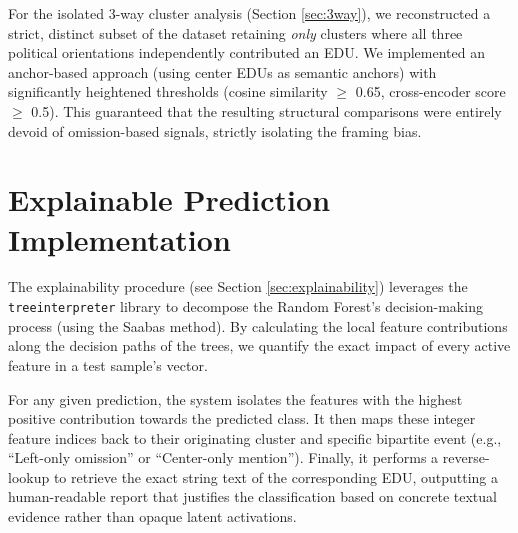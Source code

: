 \documentclass[11pt]{article}
\begin{document}
For the isolated 3-way cluster analysis (Section \ref{sec:3way}), we reconstructed a strict, distinct subset of the dataset retaining \textit{only} clusters where all three political orientations independently contributed an EDU. We implemented an anchor-based approach (using center EDUs as semantic anchors) with significantly heightened thresholds (cosine similarity $\geq$ 0.65, cross-encoder score $\geq$ 0.5). This guaranteed that the resulting structural comparisons were entirely devoid of omission-based signals, strictly isolating the framing bias.

\section{Explainable Prediction Implementation}
\label{app:explainability}
The explainability procedure (see Section \ref{sec:explainability}) leverages the \texttt{treeinterpreter} library to decompose the Random Forest's decision-making process (using the Saabas method). By calculating the local feature contributions along the decision paths of the trees, we quantify the exact impact of every active feature in a test sample's vector.

For any given prediction, the system isolates the features with the highest positive contribution towards the predicted class. It then maps these integer feature indices back to their originating cluster and specific bipartite event (e.g., ``Left-only omission'' or ``Center-only mention''). Finally, it performs a reverse-lookup to retrieve the exact string text of the corresponding EDU, outputting a human-readable report that justifies the classification based on concrete textual evidence rather than opaque latent activations.
\end{document}
